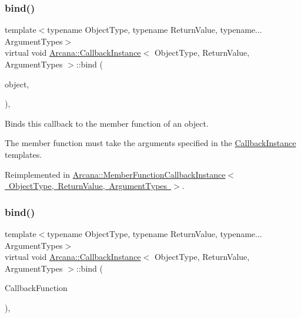 \subsubsection{\texorpdfstring{bind()}{bind()}\hspace{0.1cm}{\footnotesize\ttfamily [1/2]}}
{\footnotesize\ttfamily template$<$typename Object\+Type, typename Return\+Value, typename... Argument\+Types$>$ \\
virtual void \mbox{\hyperlink{class_arcana_1_1_callback_instance}{Arcana\+::\+Callback\+Instance}}$<$ Object\+Type, Return\+Value, Argument\+Types $>$\+::bind (\begin{DoxyParamCaption}\item[{void $\ast$}]{object,  }\item[{void(Object\+::$\ast$)()}]{ }\end{DoxyParamCaption})\hspace{0.3cm}{\ttfamily [inline]}, {\ttfamily [virtual]}}



Binds this callback to the member function of an object. 

The member function must take the arguments specified in the \mbox{\hyperlink{class_arcana_1_1_callback_instance}{Callback\+Instance}} templates. 

Reimplemented in \mbox{\hyperlink{class_arcana_1_1_member_function_callback_instance_ae93ba2e166f268d480431bb7dfd00140}{Arcana\+::\+Member\+Function\+Callback\+Instance$<$ Object\+Type, Return\+Value, Argument\+Types $>$}}.

\mbox{\label{class_arcana_1_1_callback_instance_a6d9b12af5b8a98b782257a7b10eaa7e9}} 
\subsubsection{\texorpdfstring{bind()}{bind()}\hspace{0.1cm}{\footnotesize\ttfamily [2/2]}}
{\footnotesize\ttfamily template$<$typename Object\+Type, typename Return\+Value, typename... Argument\+Types$>$ \\
virtual void \mbox{\hyperlink{class_arcana_1_1_callback_instance}{Arcana\+::\+Callback\+Instance}}$<$ Object\+Type, Return\+Value, Argument\+Types $>$\+::bind (\begin{DoxyParamCaption}\item[{Return\+Value($\ast$)(Argument\+Types...)}]{Callback\+Function }\end{DoxyParamCaption})\hspace{0.3cm}{\ttfamily [inline]}, {\ttfamily [virtual]}}



